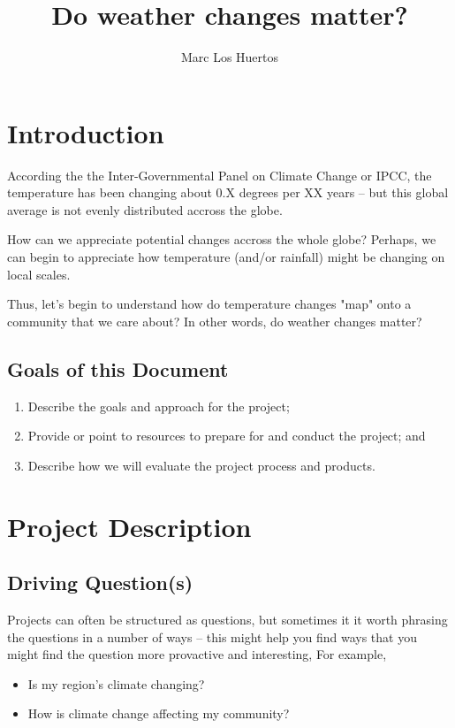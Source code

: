 \documentclass{article}\usepackage[]{graphicx}\usepackage[]{color}
\title{Do weather changes matter?}
\author{Marc Los Huertos}
\date{}
\begin{document}
\maketitle

\section{Introduction}

According the the Inter-Governmental Panel on Climate Change or IPCC, the temperature has been changing about 0.X degrees per XX years -- but this global average is not evenly distributed accross the globe. 

How can we appreciate potential changes accross the whole globe?  Perhaps, we can begin to appreciate how temperature (and/or rainfall) might be changing on local scales.

Thus, let's begin to understand how do temperature changes "map" onto a community that we care about? In other words, do weather changes matter?

\subsection{Goals of this Document}

\begin{enumerate}
  \item Describe the goals and approach for the project;
  \item Provide or point to resources to prepare for and conduct the project; and
  \item Describe how we will evaluate the project process and products.
\end{enumerate}

\section{Project Description}

\subsection{Driving Question(s)}

Projects can often be structured as questions, but sometimes it it worth phrasing the questions in a number of ways -- this might help you find ways that you might find the question more provactive and interesting, For example,

\begin{itemize}
  \item Is my region's climate changing?
  \item How is climate change affecting my community?
\end{itemize}
\end{document}

